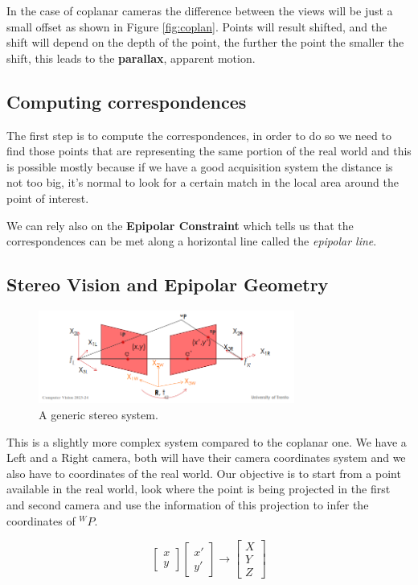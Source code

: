 In the case of coplanar cameras the difference between the views will be just a small offset as shown in Figure \ref{fig:coplan}. Points will result shifted, and the shift will depend on the depth of the point, the further the point the smaller the shift, this leads to the \textbf{parallax}, apparent motion.  

\subsection{Computing correspondences}

The first step is to compute the correspondences, in order to do so we need to find those points that are representing the same portion of the real world and this is possible mostly because if we have a good acquisition system the distance is not too big, it's normal to look for a certain match in the local area around the point of interest.

We can rely also on the \textbf{Epipolar Constraint} which tells us that the correspondences can be met along a horizontal line called the \textit{epipolar line}.

\subsection{Stereo Vision and Epipolar Geometry}

\begin{figure}[H]
    \centering
    \includegraphics[width=0.75\textwidth]{Figures/stereo.png}
    \caption{A generic stereo system.}
    \label{fig:stereo}
\end{figure}

This is a slightly more complex system compared to the coplanar one. We have a Left and a Right camera, both will have their camera coordinates system and we also have to coordinates of the real world. Our objective is to start from a point available in the real world, look where the point is being projected in the first and second camera and use the information of this projection to infer the coordinates of \({}^WP\).

\[
    \begin{bmatrix}
        x \\
        y
    \end{bmatrix}
    \begin{bmatrix}
        x' \\
        y'
    \end{bmatrix}
    \rightarrow 
    \begin{bmatrix}
        X \\
        Y \\
        Z
    \end{bmatrix}
\]

